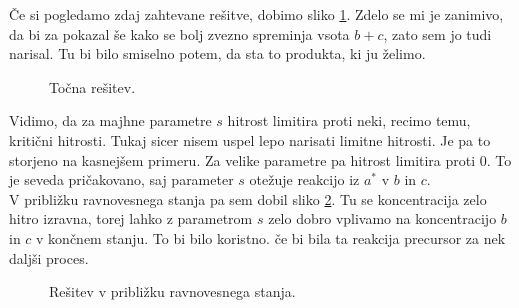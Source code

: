 \documentclass[a4paper]{article}
\begin{document}
Če si pogledamo zdaj zahtevane rešitve, dobimo sliko \ref{fig:binarna-req}. Zdelo se mi je zanimivo,
da bi za pokazal še kako se bolj zvezno spreminja vsota $b + c$, zato sem jo tudi narisal. Tu bi bilo 
smiselno potem, da sta to produkta, ki ju želimo.\\

\begin{figure}[H]
    \centering
    \caption{Točna rešitev.}
    \label{fig:binarna-req}
\end{figure}

Vidimo, da za majhne parametre $s$ hitrost limitira proti neki, recimo temu, kritični hitrosti. Tukaj 
sicer nisem uspel lepo narisati limitne hitrosti. Je pa to storjeno na kasnejšem primeru. Za velike parametre
pa hitrost limitira proti $0$. To je seveda pričakovano, saj parameter $s$ otežuje reakcijo iz $a^*$ v $b$ in $c$. \\

V približku ravnovesnega stanja pa sem dobil sliko \ref{fig:binarna-stac}. Tu se koncentracija zelo hitro
izravna, torej lahko z parametrom $s$ zelo dobro vplivamo na koncentracijo $b$ in $c$ v končnem stanju. To bi 
bilo koristno. če bi bila ta reakcija precursor za nek daljši proces.\\

\begin{figure}[H]
    \centering
    \caption{Rešitev v približku ravnovesnega stanja.}
    \label{fig:binarna-stac}
\end{figure}
\end{document}
